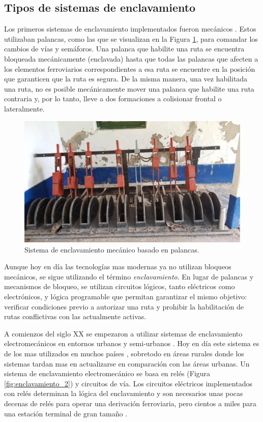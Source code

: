 \subsection{Tipos de sistemas de enclavamiento}
	\label{sec:FPGA}
	
    Los primeros sistemas de enclavamiento implementados fueron mecánicos \cite{Paper_179}. Estos utilizaban palancas, como las que se visualizan en la Figura \ref{fig:enclavamiento_1}, para comandar los cambios de vías y semáforos. Una palanca que habilite una ruta se encuentra bloqueada mecánicamente (enclavada) hasta que todas las palancas que afecten a los elementos ferroviarios correspondientes a esa ruta se encuentre en la posición que garanticen que la ruta es segura. De la misma manera, una vez habilitada una ruta, no es posible mecánicamente mover una palanca que habilite una ruta contraria y, por lo tanto, lleve a dos formaciones a colisionar frontal o lateralmente.
    
        \begin{figure}[H]
            \centering
            \includegraphics[width=1\textwidth]{Figuras/palancas.jpg}
            \centering\caption{Sistema de enclavamiento mecánico basado en palancas.}
            \label{fig:enclavamiento_1}
        \end{figure}

    Aunque hoy en día las tecnologías mas modernas ya no utilizan bloqueos mecánicos, se sigue utilizando el término \textit{enclavamiento}. En lugar de palancas y mecanismos de bloqueo, se utilizan circuitos lógicos, tanto eléctricos como electrónicos, y lógica programable que permitan garantizar el mismo objetivo: verificar condiciones previo a autorizar una ruta y prohibir la habilitación de rutas conflictivas con las actualmente activas.

    A comienzos del siglo XX se empezaron a utilizar sistemas de enclavamiento electromecánicos en entornos urbanos y semi-urbanos \cite{Paper_1}. Hoy en día este sistema es de los mas utilizados en muchos países \cite{Paper_179}, sobretodo en áreas rurales donde los sistemas tardan mas en actualizarse en comparación con las áreas urbanas. Un sistema de enclavamiento electromecánico se basa en relés (Figura \ref{fig:enclavamiento_2}) y circuitos de vía. Los circuitos eléctricos implementados con relés determinan la lógica del enclavamiento y son necesarios unas pocas decenas de relés para operar una derivación ferroviaria, pero cientos a miles para una estación terminal de gran tamaño \cite{Paper_199}.

